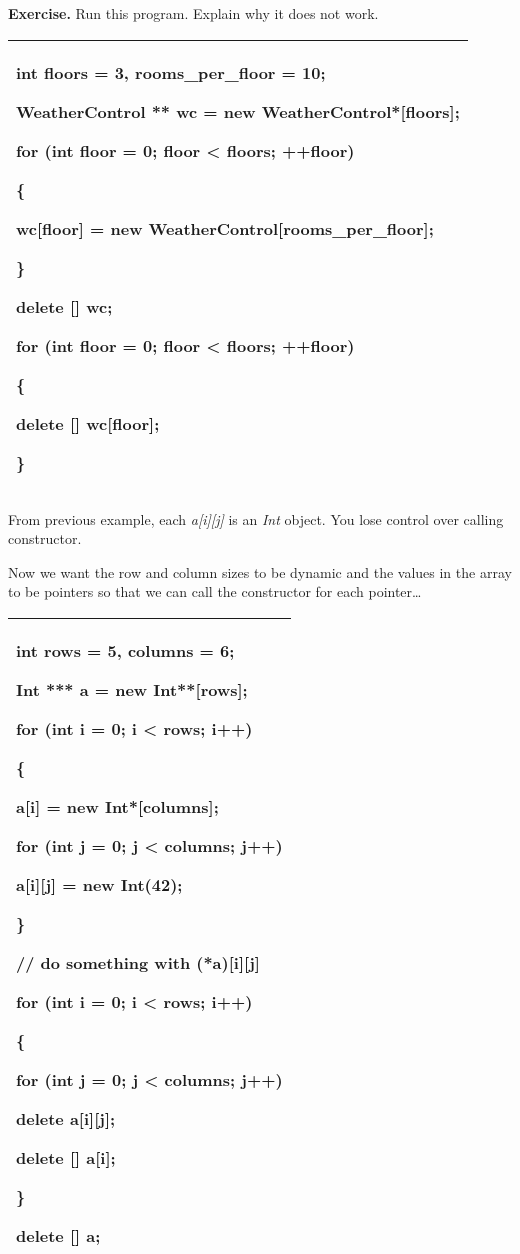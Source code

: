 \documentclass[
]{article}
\begin{document}
\textbf{Exercise. }Run this program. Explain why it does not work.

\begin{longtable}[]{@{}l@{}}
\toprule
\endhead
\begin{minipage}[t]{0.97\columnwidth}\raggedright
int floors = 3, rooms\_per\_floor = 10;

WeatherControl ** wc = new WeatherControl*{[}floors{]};

for (int floor = 0; floor \textless{} floors; ++floor)

\{

wc{[}floor{]} = new WeatherControl{[}rooms\_per\_floor{]};

\}

delete {[}{]} wc;

for (int floor = 0; floor \textless{} floors; ++floor)

\{

delete {[}{]} wc{[}floor{]};

\}\strut
\end{minipage}\tabularnewline
\bottomrule
\end{longtable}

From previous example, each \emph{a{[}i{]}{[}j{]}} is an \emph{Int}
object. You lose control over calling constructor.

Now we want the row and column sizes to be dynamic and the values in the
array to be pointers so that we can call the constructor for each
pointer\ldots{}

\begin{longtable}[]{@{}l@{}}
\toprule
\endhead
\begin{minipage}[t]{0.97\columnwidth}\raggedright
int rows = 5, columns = 6;

Int *** a = new Int**{[}rows{]};

for (int i = 0; i \textless{} rows; i++)

\{

a{[}i{]} = new Int*{[}columns{]};

for (int j = 0; j \textless{} columns; j++)

a{[}i{]}{[}j{]} = new Int(42);

\}

// do something with (*a){[}i{]}{[}j{]}

for (int i = 0; i \textless{} rows; i++)

\{

for (int j = 0; j \textless{} columns; j++)

delete a{[}i{]}{[}j{]};

delete {[}{]} a{[}i{]};

\}

delete {[}{]} a;\strut
\end{minipage}\tabularnewline
\bottomrule
\end{longtable}
\end{document}
